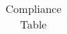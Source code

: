 \begin{table}
\begin{tabular}{|l|c|c|c|c|}
\bottomrule %
\end{tabular}
\caption{Compliance Table} %
\label{tab:compliance} %
\end{table}